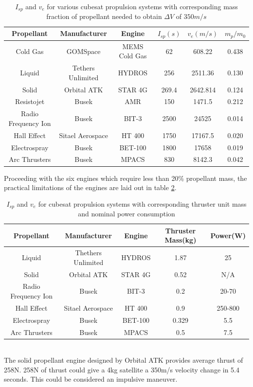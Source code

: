 \begin{table}[h!]
	\centering
	\begin{tabular}{c c c c c c }
		\hline
		Propellant & Manufacturer & Engine & $I_{sp}(s)$ & $v_e(m/s)$ & $m_p/m_0$ \\
		\hline
		Cold Gas & GOMSpace & MEMS Cold Gas & 62 & 608.22 & 0.438 \\
		Liquid & Tethers Unlimited & HYDROS & 256 & 2511.36 & 0.130 \\
		Solid & Orbital ATK & STAR 4G & 269.4 & 2642.814 & 0.124 \\
		Resistojet & Busek & AMR & 150 & 1471.5 & 0.212 \\
		Radio Frequency Ion & Busek & BIT-3 & 2500 & 24525 & 0.014 \\
		Hall Effect & Sitael Aerospace & HT 400 & 1750 & 17167.5 & 0.020 \\
		Electrospray & Busek & BET-100 & 1800 & 17658 & 0.019 \\
		Arc Thrusters & Busek & MPACS & 830 & 8142.3 & 0.042 \\
		\hline
	\end{tabular}
	\caption{$I_{sp}$ and $v_e$ for various cubesat propulsion systems with corresponding mass fraction of propellant needed to obtain $\Delta V$ of $350 m/s$}
	\label{MMtab1}
\end{table}

Proceeding with the six engines which require less than 20\% propellant mass, the practical limitations of the engines are laid out in table \ref{MMtab2}.
\\
\begin{table}[h!]
	\centering
	\begin{tabular}{c c c c c }
		\hline
		Propellant & Manufacturer & Engine & Thruster Mass(kg) & Power(W) \\
		\hline
		Liquid & Thethers Unlimited & HYDROS & 1.87 & 25 \\
		Solid & Orbital ATK & STAR 4G & 0.52 & N/A \\
		Radio Frequency Ion & Busek & BIT-3 & 0.2 & 20-70 \\
		Hall Effect & Sitael Aerospace & HT 400 & 0.9 & 250-800 \\
		Electrospray & Busek & BET-100 & 0.329 & 5.5 \\
		Arc Thrusters & Busek & MPACS & 0.5 & 7.5 \\
		\hline
	\end{tabular}
	\caption{$I_{sp}$ and $v_e$ for cubesat propulsion systems with corresponding thruster unit mass and nominal power consumption}
	\label{MMtab2}
\end{table}
\\
The solid propellant engine designed by Orbital ATK provides average thrust of 258N. 258N of thrust could give a 4kg satellite a 350m/s velocity change in 5.4 seconds. This could be considered an impulsive maneuver.

